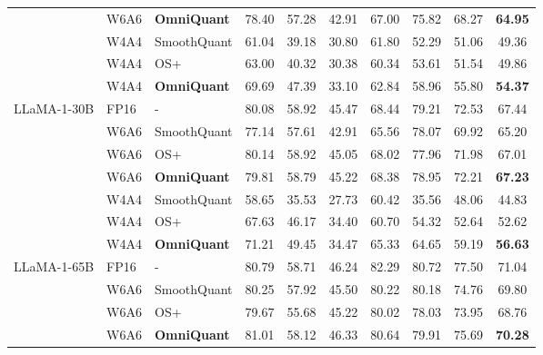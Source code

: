 \documentclass{article} %
\begin{document}
\begin{table}[t]
\begin{tabular}{lllccccccc}
        & \cellcolor{Gray}W6A6 & \cellcolor{Gray}\textbf{OmniQuant} & \cellcolor{Gray}78.40 & \cellcolor{Gray}57.28 & \cellcolor{Gray}42.91 & \cellcolor{Gray}67.00 & \cellcolor{Gray}75.82 & \cellcolor{Gray}68.27 & \cellcolor{Gray}\textbf{64.95} \\
        & W4A4 & SmoothQuant & 61.04 & 39.18 & 30.80 & 61.80 & 52.29 & 51.06 & 49.36 \\
        & W4A4 & OS+ & 63.00 & 40.32 & 30.38 & 60.34 & 53.61 & 51.54 & 49.86 \\
        &\cellcolor{Gray} W4A4 & \cellcolor{Gray}\textbf{OmniQuant} & \cellcolor{Gray}69.69 & \cellcolor{Gray}47.39 & \cellcolor{Gray}33.10 & \cellcolor{Gray}62.84 & \cellcolor{Gray}58.96 & \cellcolor{Gray}55.80 & \cellcolor{Gray}\textbf{54.37} \\
        \hline
        \multirow{5}{*}{LLaMA-1-30B} &
        FP16 & - & 80.08  & 58.92 & 45.47 & 68.44 & 79.21 & 72.53 & 67.44 \\
        & W6A6 & SmoothQuant & 77.14 & 57.61 & 42.91 & 65.56 & 78.07 & 69.92 & 65.20 \\
        & W6A6 & OS+ & 80.14 & 58.92 & 45.05 & 68.02 & 77.96 & 71.98 & 67.01 \\
        & \cellcolor{Gray}W6A6 & \cellcolor{Gray}\textbf{OmniQuant} & \cellcolor{Gray}79.81 & \cellcolor{Gray}58.79 & \cellcolor{Gray}45.22 & \cellcolor{Gray}68.38 & \cellcolor{Gray}78.95 & \cellcolor{Gray}72.21 & \cellcolor{Gray}\textbf{67.23} \\
        & W4A4 & SmoothQuant & 58.65 & 35.53 & 27.73 & 60.42 & 35.56 & 48.06 & 44.83 \\
        & W4A4 & OS+ & 67.63 & 46.17 & 34.40 & 60.70 & 54.32 & 52.64 & 52.62 \\
        & \cellcolor{Gray}W4A4 & \cellcolor{Gray}\textbf{OmniQuant} & \cellcolor{Gray}71.21 & \cellcolor{Gray}49.45 & \cellcolor{Gray}34.47 & \cellcolor{Gray}65.33 & \cellcolor{Gray}64.65 & \cellcolor{Gray}59.19 & \cellcolor{Gray}\textbf{56.63} \\
        \hline
        \multirow{5}{*}{LLaMA-1-65B} &
        FP16 & - & 80.79  & 58.71 & 46.24 & 82.29 & 80.72 & 77.50 & 71.04 \\
        & W6A6 & SmoothQuant & 80.25 & 57.92 & 45.50 & 80.22 & 80.18 & 74.76 & 69.80 \\
        & W6A6 & OS+ & 79.67 & 55.68 & 45.22 & 80.02 & 78.03 & 73.95 & 68.76 \\
        & \cellcolor{Gray}W6A6 & \cellcolor{Gray}\textbf{OmniQuant} & \cellcolor{Gray}81.01 & \cellcolor{Gray}58.12 & \cellcolor{Gray}46.33 & \cellcolor{Gray}80.64 & \cellcolor{Gray}79.91 & \cellcolor{Gray}75.69 & \cellcolor{Gray}\textbf{70.28} \\

\end{tabular}
\end{table}
\end{document}
